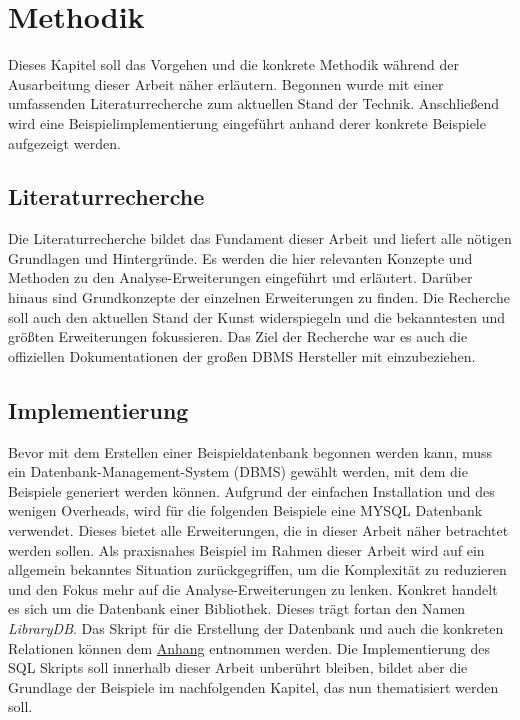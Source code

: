 \chapter{Methodik}
\label{chap:methodik} Dieses Kapitel soll das Vorgehen und die konkrete Methodik
während der Ausarbeitung dieser Arbeit näher erläutern. Begonnen wurde mit einer
umfassenden Literaturrecherche zum aktuellen Stand der Technik. Anschließend wird
eine Beispielimplementierung eingeführt anhand derer konkrete Beispiele aufgezeigt
werden.

\section{Literaturrecherche}
\label{sec:literaturrecherche} Die Literaturrecherche bildet das Fundament dieser
Arbeit und liefert alle nötigen Grundlagen und Hintergründe. Es werden die hier
relevanten Konzepte und Methoden zu den Analyse-Erweiterungen eingeführt und
erläutert. Darüber hinaus sind Grundkonzepte der einzelnen Erweiterungen zu finden.
Die Recherche soll auch den aktuellen Stand der Kunst widerspiegeln und die
bekanntesten und größten Erweiterungen fokussieren. Das Ziel der Recherche war es
auch die offiziellen Dokumentationen der großen DBMS Hersteller mit einzubeziehen.

\section{Implementierung}
\label{sec:implementierung} Bevor mit dem Erstellen einer Beispieldatenbank begonnen
werden kann, muss ein Datenbank-Management-System (DBMS) gewählt werden, mit dem
die Beispiele generiert werden können. Aufgrund der einfachen Installation und
des wenigen Overheads, wird für die folgenden Beispiele eine MYSQL Datenbank verwendet.
Dieses bietet alle Erweiterungen, die in dieser Arbeit näher betrachtet werden sollen.
Als praxisnahes Beispiel im Rahmen dieser Arbeit wird auf ein allgemein
bekanntes Situation zurückgegriffen, um die Komplexität zu reduzieren und den Fokus
mehr auf die Analyse-Erweiterungen zu lenken. Konkret handelt es sich um die
Datenbank einer Bibliothek. Dieses trägt fortan den Namen \textit{LibraryDB}. Das
Skript für die Erstellung der Datenbank und auch die konkreten Relationen können
dem \hyperref[sec:library_db]{Anhang} entnommen werden. Die Implementierung des
SQL Skripts soll innerhalb dieser Arbeit unberührt bleiben, bildet aber die Grundlage
der Beispiele im nachfolgenden Kapitel, das nun thematisiert werden soll.
